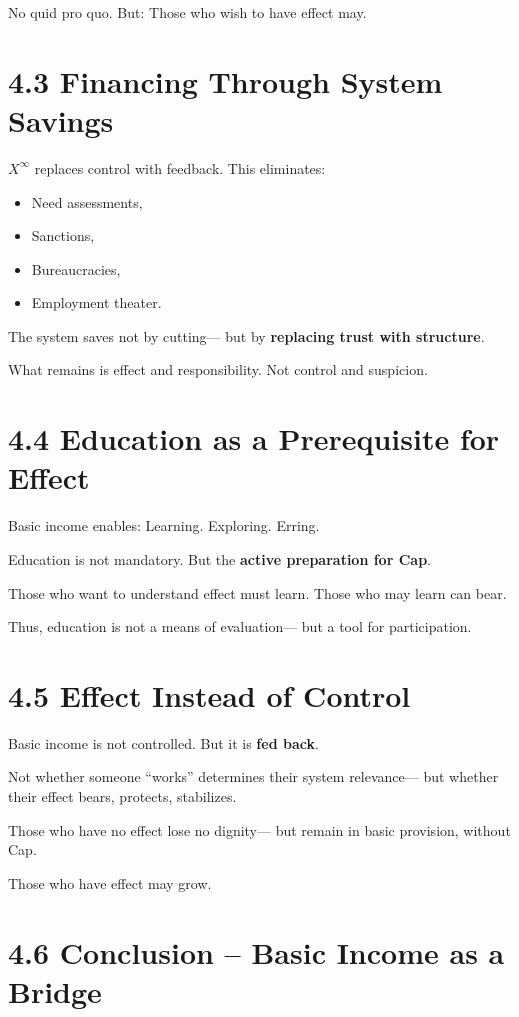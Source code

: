 \documentclass[12pt,a4paper]{book}
\begin{document}
No quid pro quo.  
But: Those who wish to have effect may.

\section*{4.3 Financing Through System Savings}

$X^\infty$ replaces control with feedback.  
This eliminates:

\begin{itemize}
  \item Need assessments,
  \item Sanctions,
  \item Bureaucracies,
  \item Employment theater.
\end{itemize}

The system saves not by cutting—  
but by \textbf{replacing trust with structure}.

What remains is effect and responsibility.  
Not control and suspicion.

\section*{4.4 Education as a Prerequisite for Effect}

Basic income enables: Learning. Exploring. Erring.

Education is not mandatory.  
But the \textbf{active preparation for Cap}.

Those who want to understand effect must learn.  
Those who may learn can bear.

Thus, education is not a means of evaluation—  
but a tool for participation.

\section*{4.5 Effect Instead of Control}

Basic income is not controlled.  
But it is \textbf{fed back}.

Not whether someone “works” determines their system relevance—  
but whether their effect bears, protects, stabilizes.

Those who have no effect lose no dignity—  
but remain in basic provision, without Cap.

Those who have effect may grow.

\section*{4.6 Conclusion – Basic Income as a Bridge}
\end{document}
